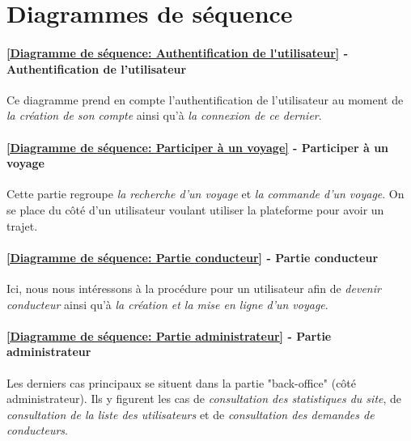 \section{Diagrammes de séquence}

\paragraph{\ref{Diagramme de séquence: Authentification de l'utilisateur} - Authentification de l'utilisateur}
Ce diagramme prend en compte l'authentification de l'utilisateur au moment de \textit{la création de son compte} ainsi qu'à \textit{la connexion de ce dernier}. 

\paragraph{\ref{Diagramme de séquence: Participer à un voyage} - Participer à un voyage}
Cette partie regroupe \textit{la recherche d'un voyage} et \textit{la commande d'un voyage}. On se place du côté d'un utilisateur voulant utiliser la plateforme pour avoir un trajet. 

\paragraph{\ref{Diagramme de séquence: Partie conducteur} - Partie conducteur}
Ici, nous nous intéressons à la procédure pour un utilisateur afin de  \textit{devenir conducteur} ainsi qu'à \textit{la création et la mise en ligne d'un voyage}.

\paragraph{\ref{Diagramme de séquence: Partie administrateur} - Partie administrateur}
Les derniers cas principaux se situent dans la partie "back-office" (côté administrateur). Ils y figurent les cas de \textit{consultation des statistiques du site}, de \textit{consultation de la liste des utilisateurs} et de \textit{consultation des demandes de conducteurs}.
